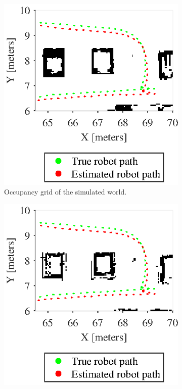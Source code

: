 \begin{figure}[htbp]
	\centering
	\begin{subfigure}[t]{0.45\textwidth}
		\includegraphics[scale=1.0]{figures/static_mapping/map_region_with_poses}
		\caption{Occupancy grid of the simulated world.}
		\label{fig:map_region_with_poses}
	\end{subfigure}
	\begin{subfigure}[t]{0.45\textwidth}
		\includegraphics[scale=1.0]{figures/static_mapping/elfes_ideal_with_poses_no_decay}

\end{subfigure}
\end{figure}

